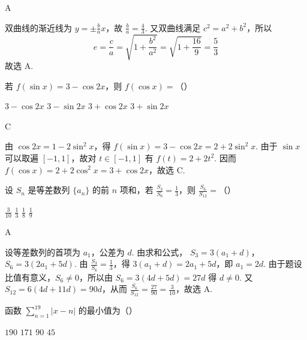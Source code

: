 \begin{answer}
A
\end{answer}

\begin{solution}
双曲线的渐近线为 \(y=\pm\frac ba x\)，故 \(\frac ba=\frac43\). 又双曲线满足 \(c^2=a^2+b^2\)，所以
\[
 e=\frac ca=\sqrt{1+\frac{b^2}{a^2}}=\sqrt{1+\frac{16}{9}}=\frac53
\]
故选 A.
\end{solution}

\begin{problem}
若 \(f(\sin x) = 3 - \cos 2x\)，则 \(f(\cos x) =\)（\quad）

\choices
    {\(3 - \cos 2x\)}
    {\(3 - \sin 2x\)}
    {\(3 + \cos 2x\)}
    {\(3 + \sin 2x\)}
\end{problem}

\begin{answer}
C
\end{answer}

\begin{solution}
由 \(\cos2x=1-2\sin^2x\)，得
\(f(\sin x)=3-\cos2x=2+2\sin^2x\). 由于 \(\sin x\) 可以取遍 \([-1,1]\)，故对 \(t\in[-1,1]\) 有 \(f(t)=2+2t^2\). 因而
\(f(\cos x)=2+2\cos^2x=3+\cos2x\)，故选 C.
\end{solution}

\begin{problem}
设 \(S_{n}\) 是等差数列 \(\{a_{n}\}\) 的前 \(n\) 项和，若 \(\frac{S_{3}}{S_{6}} = \frac{1}{3}\)，则 \(\frac{S_{6}}{S_{12}} =\)（\quad）

\choices
    {\(\frac{3}{10}\)}
    {\(\frac{1}{3}\)}
    {\(\frac{1}{8}\)}
    {\(\frac{1}{9}\)}
\end{problem}

\begin{answer}
A
\end{answer}

\begin{solution}
设等差数列的首项为 \(a_1\)，公差为 \(d\). 由求和公式，
\(S_3=3(a_1+d)\)，\(S_6=3(2a_1+5d)\). 由 \(\frac{S_3}{S_6}=\frac13\)，得
\(3(a_1+d)=2a_1+5d\)，即 \(a_1=2d\). 由于题设比值有意义，\(S_6\ne0\)，所以由
\(S_6=3(4d+5d)=27d\) 得 \(d\ne0\). 又 \(S_{12}=6(4d+11d)=90d\)，从而
\(\frac{S_6}{S_{12}}=\frac{27}{90}=\frac3{10}\)，故选 A.
\end{solution}

\begin{problem}
函数 \(\sum_{n=1}^{19} |x - n|\) 的最小值为（\quad）

\choices
    {\(190\)}
    {\(171\)}
    {\(90\)}
    {\(45\)}
\end{problem}

